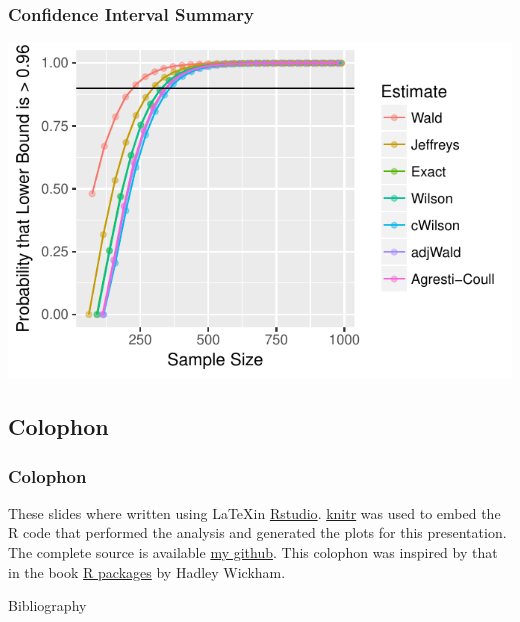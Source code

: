 \documentclass{beamer}\usepackage{knitr}
\begin{document}
\begin{frame}
\frametitle{Confidence Interval Summary}
\begin{knitrout}
\color{fgcolor}

{\centering \includegraphics[width=\linewidth]{figure/conf_summary-1} 

}



\end{knitrout}
\end{frame}




\subsection{Colophon}

\begin{frame}
\frametitle{Colophon}

These slides where written using \LaTeX in \href{http://www.rstudio.com/ide/}{Rstudio}. \href{http://yihui.name/knitr/}{knitr} was used to embed the R code that performed the analysis and generated the plots for this presentation. The complete source is available \href{https://github.com/Armadilloa16/LBT\_interview\_presentation}{my github}. This colophon was inspired by that in the book \href{http://r-pkgs.had.co.nz/intro.html\#intro-colophon}{R packages} by Hadley Wickham.

\end{frame}



\begin{frame}{Bibliography}


\end{frame}
\end{document}
